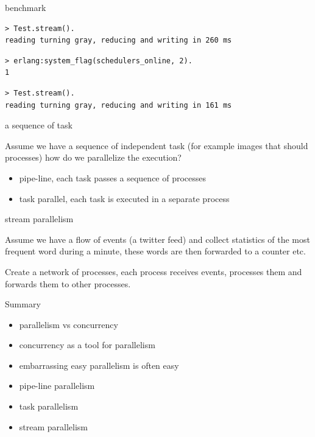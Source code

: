 \begin{frame}[fragile]{benchmark}

\begin{verbatim}
> Test.stream().
reading turning gray, reducing and writing in 260 ms 
\end{verbatim}
\pause
\begin{verbatim}
> erlang:system_flag(schedulers_online, 2). 
1
\end{verbatim}
\pause
\begin{verbatim}
> Test.stream().
reading turning gray, reducing and writing in 161 ms 
\end{verbatim}

\end{frame}

\begin{frame}{a sequence of task}

  Assume we have a sequence of independent task (for example images
  that should processes) how do we parallelize the execution?

\pause\vspace{10pt}
\begin{itemize}
\pause\item pipe-line, each task passes a sequence of processes 
\pause\item task parallel, each task is executed in a separate process
\end{itemize}

\pause\vspace{20pt}{\em Pros and cons?}

\end{frame}

\begin{frame}{stream parallelism}

  Assume we have a flow of events (a twitter feed) and collect
  statistics of the most frequent word during a minute, these words
  are then forwarded to a counter etc.

\pause\vspace{10pt}

  Create a network of processes, each process receives events,
  processes them and forwards them to other processes.

\pause\vspace{20pt}{\em Apache Storm.}


\end{frame}

\begin{frame}{Summary}


\begin{itemize}
\pause\item parallelism vs concurrency
\pause\item concurrency as a tool for parallelism 
\pause\item embarrassing easy parallelism is often easy
\pause\item pipe-line parallelism 
\pause\item task parallelism 
\pause\item stream parallelism
\end{itemize}

\end{frame}


